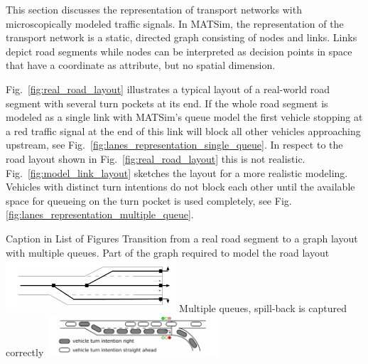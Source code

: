 This section discusses the representation of transport networks with microscopically modeled traffic signals. 
In MATSim, the representation of the transport network is a static, directed graph consisting of nodes and links. 
Links depict road segments while nodes can be interpreted as decision points in space that have a coordinate as attribute, but no spatial dimension. 


Fig.~\ref{fig:real_road_layout} illustrates a typical layout of a real-world road segment with several turn pockets at its end. 
If the whole road segment is modeled as a single link with MATSim's queue model the first vehicle stopping at a red traffic signal at the end of this link will block all other vehicles approaching upstream, see Fig.~\ref{fig:lanes_representation_single_queue}. 
In respect to the road layout shown in Fig.~\ref{fig:real_road_layout} this is not realistic. 
Fig.~\ref{fig:model_link_layout} sketches the layout for a more realistic modeling. 
Vehicles with distinct turn intentions do not block each other until the available space for queueing on the turn pocket is used completely, see Fig.\ref{fig:lanes_representation_multiple_queue}. 

\createfigure%
{Caption in List of Figures}%
{Transition from a real road segment to a graph layout with multiple queues.}
{\label{fig:lanes_representation}}%
{%
  \createsubfigure%
	{Part of the graph required to model the road layout}
	{\includegraphics[width=0.475\textwidth]{extending/figures/signalslanes/link_lanes_layout}}
	{\label{fig:model_link_layout}}
  \createsubfigure%
	{Multiple queues, spill-back is captured correctly}%
	{\includegraphics[width=0.48\textwidth]{extending/figures/signalslanes/multiple_queue_model_inkscape.pdf}}%
	{\label{fig:lanes_representation_multiple_queue}}%
}%
{\citet{Grether2014PhD}}

